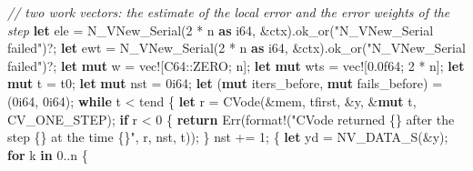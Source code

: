\documentclass[
  10pt,
]{article}
\newenvironment{Shaded}{}{}
\newcommand{\CommentTok}[1]{\textcolor[rgb]{0.38,0.63,0.69}{\textit{#1}}}
\newcommand{\ConstantTok}[1]{\textcolor[rgb]{0.53,0.00,0.00}{#1}}
\newcommand{\ControlFlowTok}[1]{\textcolor[rgb]{0.00,0.44,0.13}{\textbf{#1}}}
\newcommand{\DataTypeTok}[1]{\textcolor[rgb]{0.56,0.13,0.00}{#1}}
\newcommand{\DecValTok}[1]{\textcolor[rgb]{0.25,0.63,0.44}{#1}}
\newcommand{\KeywordTok}[1]{\textcolor[rgb]{0.00,0.44,0.13}{\textbf{#1}}}
\newcommand{\NormalTok}[1]{#1}
\newcommand{\OperatorTok}[1]{\textcolor[rgb]{0.40,0.40,0.40}{#1}}
\newcommand{\PreprocessorTok}[1]{\textcolor[rgb]{0.74,0.48,0.00}{#1}}
\newcommand{\StringTok}[1]{\textcolor[rgb]{0.25,0.44,0.63}{#1}}
\begin{document}
\begin{Shaded}
\begin{Highlighting}[]
    \CommentTok{// two work vectors: the estimate of the local error and the error weights of the step}
    \KeywordTok{let}\NormalTok{ ele }\OperatorTok{=}\NormalTok{ N\_VNew\_Serial(}\DecValTok{2} \OperatorTok{*}\NormalTok{ n }\KeywordTok{as} \DataTypeTok{i64}\OperatorTok{,} \OperatorTok{\&}\NormalTok{ctx)}\OperatorTok{.}\NormalTok{ok\_or(}\StringTok{"N\_VNew\_Serial failed"}\NormalTok{)}\OperatorTok{?;}
    \KeywordTok{let}\NormalTok{ ewt }\OperatorTok{=}\NormalTok{ N\_VNew\_Serial(}\DecValTok{2} \OperatorTok{*}\NormalTok{ n }\KeywordTok{as} \DataTypeTok{i64}\OperatorTok{,} \OperatorTok{\&}\NormalTok{ctx)}\OperatorTok{.}\NormalTok{ok\_or(}\StringTok{"N\_VNew\_Serial failed"}\NormalTok{)}\OperatorTok{?;}
    \KeywordTok{let} \KeywordTok{mut}\NormalTok{ w }\OperatorTok{=} \PreprocessorTok{vec!}\NormalTok{[}\PreprocessorTok{C64::}\NormalTok{ZERO}\OperatorTok{;}\NormalTok{ n]}\OperatorTok{;}
    \KeywordTok{let} \KeywordTok{mut}\NormalTok{ wts }\OperatorTok{=} \PreprocessorTok{vec!}\NormalTok{[}\DecValTok{0.0f64}\OperatorTok{;} \DecValTok{2} \OperatorTok{*}\NormalTok{ n]}\OperatorTok{;}
    \KeywordTok{let} \KeywordTok{mut}\NormalTok{ t }\OperatorTok{=}\NormalTok{ t0}\OperatorTok{;}
    \KeywordTok{let} \KeywordTok{mut}\NormalTok{ nst }\OperatorTok{=} \DecValTok{0i64}\OperatorTok{;}
    \KeywordTok{let}\NormalTok{ (}\KeywordTok{mut}\NormalTok{ iters\_before}\OperatorTok{,} \KeywordTok{mut}\NormalTok{ fails\_before) }\OperatorTok{=}\NormalTok{ (}\DecValTok{0i64}\OperatorTok{,} \DecValTok{0i64}\NormalTok{)}\OperatorTok{;}
    \ControlFlowTok{while}\NormalTok{ t }\OperatorTok{\textless{}}\NormalTok{ tend }\OperatorTok{\{}
        \KeywordTok{let}\NormalTok{ r }\OperatorTok{=}\NormalTok{ CVode(}\OperatorTok{\&}\NormalTok{mem}\OperatorTok{,}\NormalTok{ tfirst}\OperatorTok{,} \OperatorTok{\&}\NormalTok{y}\OperatorTok{,} \OperatorTok{\&}\KeywordTok{mut}\NormalTok{ t}\OperatorTok{,}\NormalTok{ CV\_ONE\_STEP)}\OperatorTok{;}
        \ControlFlowTok{if}\NormalTok{ r }\OperatorTok{\textless{}} \DecValTok{0} \OperatorTok{\{}
            \ControlFlowTok{return} \ConstantTok{Err}\NormalTok{(}\PreprocessorTok{format!}\NormalTok{(}\StringTok{"CVode returned \{\} after the step \{\} at the time \{\}"}\OperatorTok{,}\NormalTok{ r}\OperatorTok{,}\NormalTok{ nst}\OperatorTok{,}\NormalTok{ t))}\OperatorTok{;}
        \OperatorTok{\}}
\NormalTok{        nst }\OperatorTok{+=} \DecValTok{1}\OperatorTok{;}
        \OperatorTok{\{}
            \KeywordTok{let}\NormalTok{ yd }\OperatorTok{=}\NormalTok{ NV\_DATA\_S(}\OperatorTok{\&}\NormalTok{y)}\OperatorTok{;}
            \ControlFlowTok{for}\NormalTok{ k }\KeywordTok{in} \DecValTok{0}\OperatorTok{..}\NormalTok{n }\OperatorTok{\{}

\end{Highlighting}
\end{Shaded}
\end{document}
